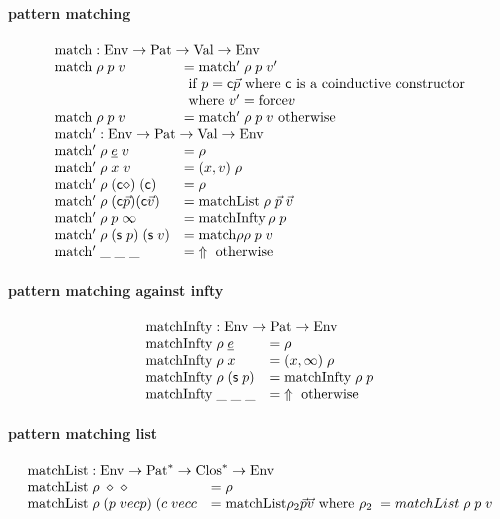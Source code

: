 \paragraph*{pattern matching}
\[
\begin{array}{ll}
\multicolumn{2}{l}{\match : \Env \ra \Pat \ra \Val \ra \Env}\\
\match \; \rho \; p \; v & = \matchf \; \rho \; p \; v' \\
& \mbox{ if } p = \cc \vec{p} \mbox{ where } \cc  \mbox{ is a coinductive constructor}\\
& \mbox{ where } v' = \forc v \\
\match \; \rho \; p \; v & = \matchf \; \rho \; p \; v \mbox{ otherwise}\\
\multicolumn{2}{l}{\matchf : \Env \ra \Pat \ra \Val \ra \Env}\\
\matchf \; \rho \; \inacc{e} \; v & = \rho \\
\matchf \; \rho \; x \; v & = (x,v)\; \rho \\
\matchf \; \rho \; (\cc \diamond) \; (\cc) & = \rho \\
\matchf \; \rho \; (\cc \vec{p}) (\cc \vec{v}) & = \matchList \; \rho \; \vec{p} \; \vec{v} \\
\matchf \; \rho \; p \; \infty & = \matchInfty \, \rho \; p \\
\matchf \; \rho \; (\s p) \; (\s v) & = \match \rho \rho \; p \; v \\
\matchf \; \_ \; \_ \; \_ & = \stuck \mbox{ otherwise}
\end{array}
\]

\paragraph*{pattern matching against infty}
\[
\begin{array}{ll}
\multicolumn{2}{l}{\matchInfty : \Env \ra \Pat \ra \Env}\\
\matchInfty \; \rho \; \inacc{e} & = \rho\\
\matchInfty \; \rho \; x & = (x,\infty)\; \rho \\
\matchInfty \; \rho \; (\s p)  & = \matchInfty \; \rho \; p \\
\matchInfty \; \_ \; \_ \; \_ & = \stuck \mbox{ otherwise}
\end{array}
\]
\paragraph*{pattern matching list}
\[
\begin{array}{ll}
\multicolumn{2}{l}{\matchList : \Env \ra \ves{\Pat} \ra \ves{\Clos} \ra \Env }\\
\matchList \; \rho \; \diamond \; \diamond & = \rho \\
\matchList \; \rho \; (p \; vec{p}) \; (c \; vec{c} & = \matchList \rho_2 \vec{p} \vec{v} \mbox{ where } \rho_2 \; = matchList \; \rho \; p \; v \\
\end{array}
\]

